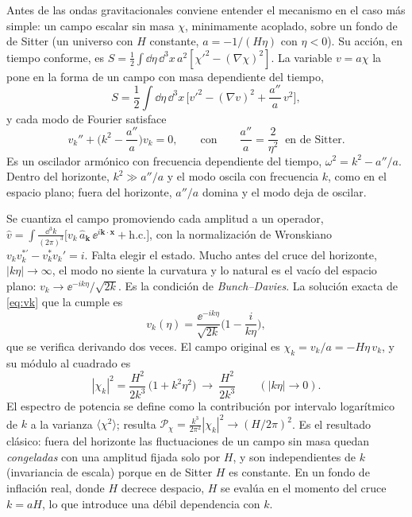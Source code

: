 Antes de las ondas gravitacionales conviene entender el mecanismo en el caso más simple: un campo escalar sin masa $\chi$, minimamente acoplado, sobre un fondo de de Sitter (un universo con $H$ constante, $a=-1/(H\eta)$ con $\eta<0$). Su acción, en tiempo conforme, es $S=\tfrac12\int\dd\eta\,\dd^3x\,a^2[\chi'^2-(\nabla\chi)^2]$. La variable $v=a\chi$ la pone en la forma de un campo con masa dependiente del tiempo,
\begin{equation}
S=\frac12\int\dd\eta\,\dd^3x\,\Big[v'^2-(\nabla v)^2+\frac{a''}{a}\,v^2\Big],
\label{eq:Sv}
\end{equation}
y cada modo de Fourier satisface
\begin{equation}
v_k''+\Big(k^2-\frac{a''}{a}\Big)v_k=0,\qquad\text{con}\qquad \frac{a''}{a}=\frac{2}{\eta^2}\ \text{ en de Sitter.}
\label{eq:vk}
\end{equation}
Es un oscilador armónico con frecuencia dependiente del tiempo, $\omega^2=k^2-a''/a$. Dentro del horizonte, $k^2\gg a''/a$ y el modo oscila con frecuencia $k$, como en el espacio plano; fuera del horizonte, $a''/a$ domina y el modo deja de oscilar.

Se cuantiza el campo promoviendo cada amplitud a un operador, $\hat v=\int\!\frac{\dd^3k}{(2\pi)^3}\big[v_k\,\hat a_{\mathbf k}\,\ee^{i\mathbf k\cdot\mathbf x}+\mathrm{h.c.}\big]$, con la normalización de Wronskiano $v_kv_k^{*\prime}-v_k^*v_k'=i$. Falta elegir el estado. Mucho antes del cruce del horizonte, $|k\eta|\to\infty$, el modo no siente la curvatura y lo natural es el vacío del espacio plano: $v_k\to\ee^{-ik\eta}/\sqrt{2k}$. Es la condición de \emph{Bunch--Davies}. La solución exacta de \eqref{eq:vk} que la cumple es
\begin{equation}
v_k(\eta)=\frac{\ee^{-ik\eta}}{\sqrt{2k}}\Big(1-\frac{i}{k\eta}\Big),
\label{eq:vkBD}
\end{equation}
que se verifica derivando dos veces. El campo original es $\chi_k=v_k/a=-H\eta\,v_k$, y su módulo al cuadrado es
\begin{equation}
|\chi_k|^2=\frac{H^2}{2k^3}\,\big(1+k^2\eta^2\big)\ \longrightarrow\ \frac{H^2}{2k^3}\qquad(|k\eta|\to0).
\label{eq:chi2}
\end{equation}
El espectro de potencia se define como la contribución por intervalo logarítmico de $k$ a la varianza $\langle\chi^2\rangle$; resulta $\mathcal P_\chi=\frac{k^3}{2\pi^2}|\chi_k|^2\to(H/2\pi)^2$. Es el resultado clásico: fuera del horizonte las fluctuaciones de un campo sin masa quedan \emph{congeladas} con una amplitud fijada solo por $H$, y son independientes de $k$ (invariancia de escala) porque en de Sitter $H$ es constante. En un fondo de inflación real, donde $H$ decrece despacio, $H$ se evalúa en el momento del cruce $k=aH$, lo que introduce una débil dependencia con $k$.

